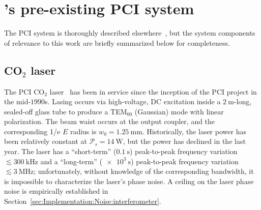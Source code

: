 \section{\diiid's pre-existing PCI system}
\label{sec:Implementation:PCI}
The \diiid \space PCI system is
thoroughly described elsewhere~\cite{dorris_rsi09, dorris_phd}, but
the system components of relevance to this work
are briefly summarized below for completeness.


\subsection{CO$_2$ laser}
\label{sec:Implementation:PCI:laser}
The PCI CO$_2$ laser~\cite[Sec.~3.3]{coda_phd}
has been in service since
the inception of the \diiid\space PCI project in the mid-$1990$s.
Lasing occurs via high-voltage, DC excitation
inside a $\SI{2}{\meter}$-long, sealed-off glass tube
to produce a TEM$_{00}$ (Gaussian) mode with linear polarization.
The beam waist occurs at the output coupler, and
the corresponding 1/e $E$ radius is $w_0 = \SI{1.25}{\milli\meter}$.
Historically, the laser power has been relatively constant
at $\mathcal{P}_s = \SI{14}{\watt}$, but
the power has declined in the last year.
The laser has
a ``short-term'' ($\SI{0.1}{\second}$) peak-to-peak frequency variation
$\lesssim \SI{300}{\kilo\hertz}$ and
a ``long-term'' ($\SI{e3}{\second}$) peak-to-peak frequency variation
$\lesssim \SI{3}{\mega\hertz}$;
unfortunately, without knowledge of the corresponding bandwidth,
it is impossible to characterize the laser's phase noise.
A ceiling on the laser phase noise is empirically established in
Section~\ref{sec:Implementation:Noise:interferometer}.


